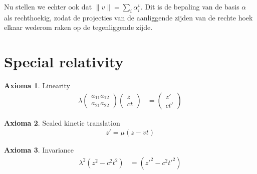 \documentclass{amsart}
\theoremstyle{definition}
\newtheorem{axm}{Axioma}[section]
\newcommand{\norm}[1]{\lVert#1\rVert}
\begin{document}
Nu stellen we echter ook dat $\norm{v} = \sum_i \alpha_i^v$. Dit is de bepaling van de basis $\alpha$ als rechthoekig, zodat de projecties van de aanliggende zijden van de rechte hoek elkaar wederom raken op de tegenliggende zijde.

\newpage

\section{Special relativity}
\begin{axm}
	Linearity
	\begin{align*}
		\lambda
		\begin{pmatrix}
			a_{11} a_{12} \\
			a_{21} a_{22}
		\end{pmatrix}
		\begin{pmatrix}
			z \\
			ct
		\end{pmatrix}
		 & =
		\begin{pmatrix}
			z' \\
			ct'
		\end{pmatrix}
	\end{align*}
\end{axm}
\begin{axm}
	Scaled kinetic translation
	\begin{align*}
		z' = \mu(z - vt)
	\end{align*}
\end{axm}
\begin{axm}
	Invariance
	\begin{align*}
		\lambda^2(z^2 - c^2t^2) & = ({z'}^2 - c^2{t'}^2)
	\end{align*}
\end{axm}
\end{document}
